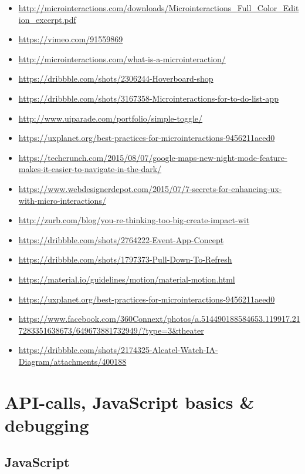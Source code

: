 \documentclass{article}
\begin{document}
\begin{itemize}
    \item \url{http://microinteractions.com/downloads/Microinteractions_Full_Color_Edition_excerpt.pdf}
    \item \url{https://vimeo.com/91559869}
    \item \url{http://microinteractions.com/what-is-a-microinteraction/}
    \item \url{https://dribbble.com/shots/2306244-Hoverboard-shop}
    \item \url{https://dribbble.com/shots/3167358-Microinteractions-for-to-do-list-app}
    \item \url{http://www.uiparade.com/portfolio/simple-toggle/}
    \item \url{https://uxplanet.org/best-practices-for-microinteractions-9456211aeed0}
    \item \url{https://techcrunch.com/2015/08/07/google-maps-new-night-mode-feature-makes-it-easier-to-navigate-in-the-dark/}
    \item \url{https://www.webdesignerdepot.com/2015/07/7-secrets-for-enhancing-ux-with-micro-interactions/}
    \item \url{http://zurb.com/blog/you-re-thinking-too-big-create-impact-wit}
    \item \url{https://dribbble.com/shots/2764222-Event-App-Concept}
    \item \url{https://dribbble.com/shots/1797373-Pull-Down-To-Refresh}
    \item \url{https://material.io/guidelines/motion/material-motion.html}
    \item \url{https://uxplanet.org/best-practices-for-microinteractions-9456211aeed0}
    \item \url{https://www.facebook.com/360Connext/photos/a.514490188584653.119917.217283351638673/649673881732949/?type=3&theater}
    \item \url{https://dribbble.com/shots/2174325-Alcatel-Watch-IA-Diagram/attachments/400188}
\end{itemize}


\section{API-calls, JavaScript basics \& debugging}

\subsection{JavaScript}
\end{document}
